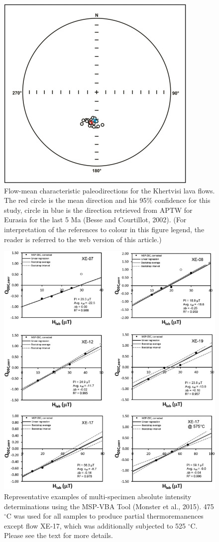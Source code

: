 \documentclass[review]{elsarticle}
\begin{document}
\begin{figure}
    \centering
    \includegraphics{6.jpg}
    \caption{Flow-mean characteristic paleodirections for the Khertvisi lava flows.
The red circle is the mean direction and his 95\% confidence for this study, circle
in blue is the direction retrieved from APTW for Eurasia for the last 5 Ma (Besse
and Courtillot, 2002). (For interpretation of the references to colour in this
figure legend, the reader is referred to the web version of this article.)}
    \label{fig:my_label}
\end{figure}
\begin{figure}
    \centering
    \includegraphics[width=12cm]{7.jpg}
    \caption{Representative examples of multi-specimen absolute intensity determinations using the MSP-VBA Tool (Monster et al., 2015). 475 $^{\circ}$C was used for all samples
to produce partial thermoremanences except flow XE-17, which was additionally subjected to 525 $^{\circ}$C. Please see the text for more details.}
    \label{fig:my_label}
\end{figure}
\end{document}
